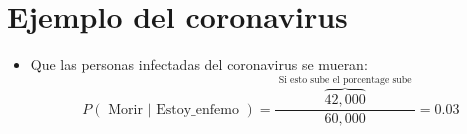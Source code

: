 \section{Ejemplo del coronavirus}
\begin{itemize}
    \item Que las personas infectadas del coronavirus se mueran:
        \[
          P(\text{  Morir  }|\text{  Estoy\_enfemo  }) = \frac{\overbrace{42,000}^{\text{  Si esto sube el porcentage sube  }}}{60,000} = 0.03
        \]
    
\end{itemize}


